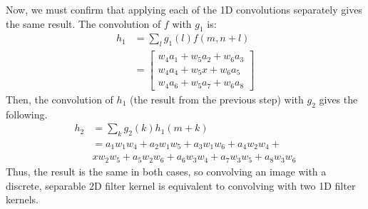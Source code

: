 \documentclass[12pt]{article}
\begin{document}
\begin{enumerate}
\begin{enumerate}
		Now, we must confirm that applying each of the 1D convolutions separately gives the same result. The convolution of $f$ with $g_1$ is:
		\begin{align*}
		h_1 &= \sum_l g_1(l) f(m, n+l) \\
		&= \begin{bmatrix}
		w_4a_1 + w_5a_2 + w_6a_3 \\
		w_4a_4 + w_5x + w_6a_5 \\
		w_4a_6 + w_5a_7 + w_6a_8
		\end{bmatrix}
		\end{align*}
		Then, the convolution of $h_1$ (the result from the previous step) with $g_2$ gives the following.
		\begin{align*}
		h_2 &= \sum_k g_2(k) h_1(m + k) \\
		&= a_1w_1w_4 + a_2w_1w_5 + a_3w_1w_6 + a_4w_2w_4 + \\ &xw_2w_5 + a_5w_2w_6 + a_6w_3w_4 + a_7w_3w_5 + a_8w_3w_6
		\end{align*}
		Thus, the result is the same in both cases, so convolving an image with a discrete, separable 2D filter kernel is equivalent to convolving with two 1D filter kernels.
		

\end{enumerate}
\end{enumerate}
\end{document}
